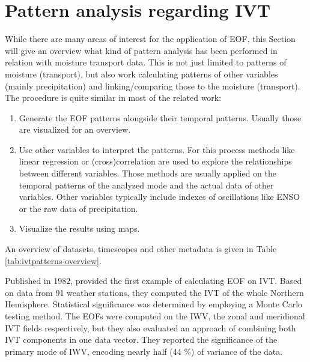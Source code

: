 \section{Pattern analysis regarding IVT}
\label{sec:related_pattern_analysis}





While there are many areas of interest for the application of EOF, this Section will give an overview what kind of pattern analysis has been performed in relation with moisture transport data.
This is not just limited to patterns of moisture (transport), but also work calculating patterns of other variables (mainly precipitation) and linking/comparing those to the moisture (transport). 
The procedure is quite similar in most of the related work: 

\begin{enumerate}[noitemsep]
  \item Generate the EOF patterns alongside their temporal patterns. Usually those are visualized for an overview. 
  \item Use other variables to interpret the patterns. For this process methods like linear regression or (cross)correlation are used to explore the relationships between different variables. Those methods are usually applied on the temporal patterns of the analyzed mode and the actual data of other variables. Other variables typically include indexes of oscillations like ENSO \cite{ayantobo_integrated_2022, kim_ensos_2015} or the raw data of precipitation. 
  \item Visualize the results using maps. 
\end{enumerate}

An overview of datasets, timescopes and other metadata is given in Table \ref{tab:ivtpatterns-overview}.

Published in 1982, \citeauthor{salstein_modes_1983} provided the first example of calculating EOF on IVT. 
Based on data from 91 weather stations, they computed the IVT of the whole Northern Hemisphere. 
Statistical significance was determined by employing a Monte Carlo testing method. 
The EOFs were computed on the IWV, the zonal and meridional IVT fields respectively, but they also evaluated an approach of combining both IVT components in one data vector. 
They reported the significance of the primary mode of IWV, encoding nearly half (44 \%) of variance of the data.

